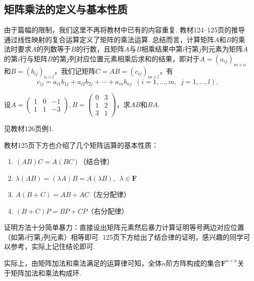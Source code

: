 \subsection{矩阵乘法的定义与基本性质}

由于篇幅的限制，我们这里不再将教材中已有的内容重复. 教材124--125页的推导通过线性映射的复合运算定义了矩阵的乘法运算. 总结而言，计算矩阵$A$和$B$的乘法时要求$A$的列数等于$B$的行数，且矩阵$A$与$B$相乘结果中第$i$行第$j$列元素为矩阵$A$的第$i$行与矩阵$B$的第$j$列对应位置元素相乘后求和的结果，即对于$A=(a_{ij})_{m \times n}$和$B=(b_{ij})_{n \times l}$，我们记矩阵$C=AB=(c_{ij})_{m \times l}$，有
\[c_{ij}=a_{i1}b_{1j}+a_{i2}b_{2j}+\cdots+a_{in}b_{nj}\enspace(i=1,\ldots,m,\enspace j=1,\ldots,l).\]

\begin{example}
    设$A=\begin{pmatrix}
            1 & 0 & -1 \\
            1 & 1 & -3
        \end{pmatrix}, B=\begin{pmatrix}
            0 & 3 \\
            1 & 2 \\
            3 & 1
        \end{pmatrix}$，求$AB$和$BA$.
\end{example}

\begin{solution}
    见教材126页例1.
\end{solution}

教材125页下方也介绍了几个矩阵运算的基本性质：
\begin{enumerate}
    \item $(AB)C=A(BC)$（结合律）

    \item $\lambda(AB)=(\lambda A)B=A(\lambda B),\enspace \lambda \in \mathbf{F}$

    \item $A(B+C)=AB+AC$（左分配律）

    \item $(B+C)P=BP+CP$（右分配律）
\end{enumerate}
证明方法十分简单暴力：直接设出矩阵元素然后暴力计算证明等号两边对应位置（如第$i$行第$j$列元素）相等即可. 125页下方给出了结合律的证明，感兴趣的同学可以参考，实际上记住结论即可.

实际上，由矩阵加法和乘法满足的运算律可知，全体$n$阶方阵构成的集合$\mathbf{F}^{n\times n}$关于矩阵加法和乘法构成环.

